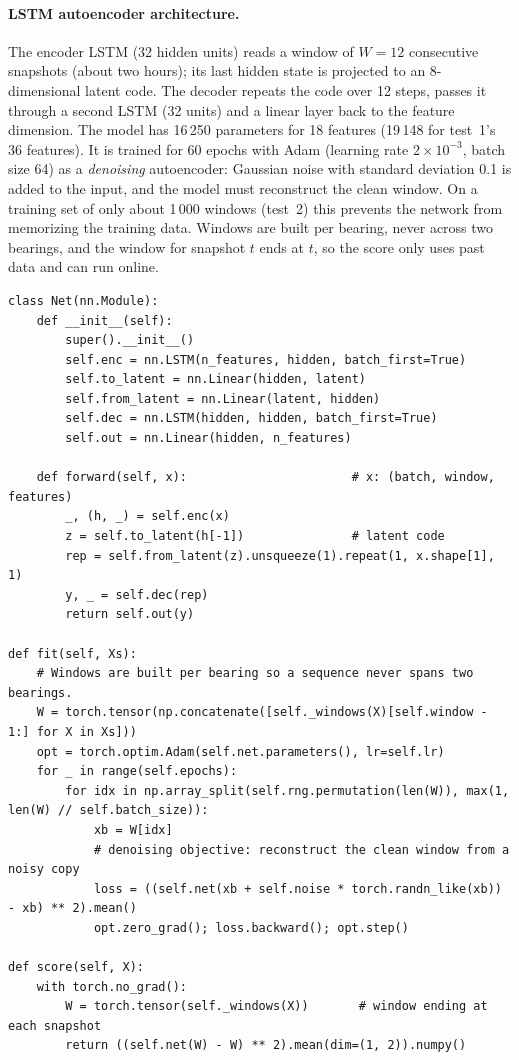 \documentclass[11pt]{article}
\begin{document}
\paragraph{LSTM autoencoder architecture.} The encoder LSTM (32 hidden units) reads a window of
$W=12$ consecutive snapshots (about two hours); its last hidden state is projected to an 8-dimensional
latent code. The decoder repeats the code over 12 steps, passes it through a second LSTM (32 units)
and a linear layer back to the feature dimension. The model has 16\,250 parameters for 18 features
(19\,148 for test~1's 36 features). It is trained for 60 epochs with Adam (learning rate
$2\times10^{-3}$, batch size 64) as a \emph{denoising} autoencoder: Gaussian noise with standard
deviation 0.1 is added to the input, and the model must reconstruct the clean window. On a training
set of only about 1\,000 windows (test~2) this prevents the network from memorizing the training data.
Windows are built per bearing, never across two bearings, and the window for snapshot $t$ ends at $t$,
so the score only uses past data and can run online.

\begin{lstlisting}[caption={LSTM autoencoder (excerpt of \code{src/bearing\_efw/models.py}).},label=lst:lstm]
class Net(nn.Module):
    def __init__(self):
        super().__init__()
        self.enc = nn.LSTM(n_features, hidden, batch_first=True)
        self.to_latent = nn.Linear(hidden, latent)
        self.from_latent = nn.Linear(latent, hidden)
        self.dec = nn.LSTM(hidden, hidden, batch_first=True)
        self.out = nn.Linear(hidden, n_features)

    def forward(self, x):                       # x: (batch, window, features)
        _, (h, _) = self.enc(x)
        z = self.to_latent(h[-1])               # latent code
        rep = self.from_latent(z).unsqueeze(1).repeat(1, x.shape[1], 1)
        y, _ = self.dec(rep)
        return self.out(y)

def fit(self, Xs):
    # Windows are built per bearing so a sequence never spans two bearings.
    W = torch.tensor(np.concatenate([self._windows(X)[self.window - 1:] for X in Xs]))
    opt = torch.optim.Adam(self.net.parameters(), lr=self.lr)
    for _ in range(self.epochs):
        for idx in np.array_split(self.rng.permutation(len(W)), max(1, len(W) // self.batch_size)):
            xb = W[idx]
            # denoising objective: reconstruct the clean window from a noisy copy
            loss = ((self.net(xb + self.noise * torch.randn_like(xb)) - xb) ** 2).mean()
            opt.zero_grad(); loss.backward(); opt.step()

def score(self, X):
    with torch.no_grad():
        W = torch.tensor(self._windows(X))       # window ending at each snapshot
        return ((self.net(W) - W) ** 2).mean(dim=(1, 2)).numpy()
\end{lstlisting}
\end{document}
